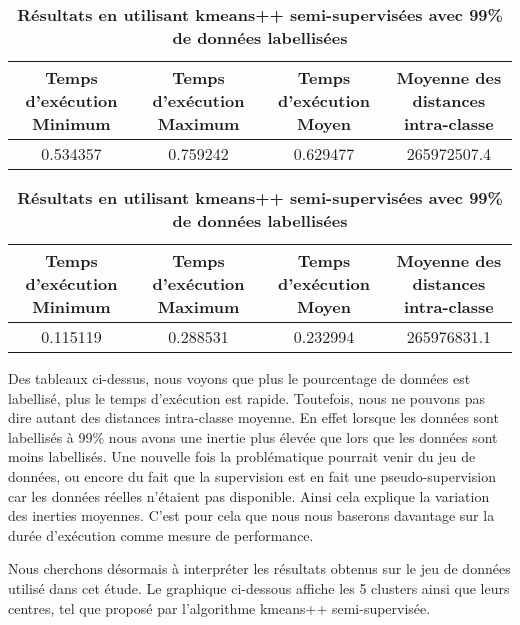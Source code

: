 \documentclass[ ]{article}
\begin{document}
\vspace{10mm}
\noindent

\begin{table}[ht]
\footnotesize
\centering

\caption{\textbf{Résultats en utilisant kmeans++ semi-supervisées avec 25\% de données labellisées}} 
\begin{tabular}{c|c|c|c}
\hline
\rowcolor{Gray}
Temps d'exécution Minimum & Temps d'exécution Maximum & Temps d'exécution Moyen & Moyenne des distances intra-classe \\
\hline
0.534357&0.759242& 0.629477& \cellcolor{LightCyan}265972507.4\\

\end{tabular}

\centering

\vspace{10 mm}
\caption{\textbf{Résultats en utilisant kmeans++ semi-supervisées avec 99\% de données labellisées}} 

\begin{tabular}{c|c|c|c}
\hline
\rowcolor{Gray}
Temps d'exécution Minimum & Temps d'exécution Maximum & Temps d'exécution Moyen & Moyenne des distances intra-classe \\
\hline
0.115119&0.288531& 0.232994& \cellcolor{LightCyan}265976831.1\\
\end{tabular}

\end{table}

\vspace{10 mm}

Des tableaux ci-dessus, nous voyons que plus le pourcentage de données est labellisé, plus le temps d'exécution est rapide. Toutefois, nous ne pouvons pas dire autant des distances intra-classe moyenne. En effet lorsque les données sont labellisés à 99\% nous avons une inertie plus élevée que lors que les données sont moins labellisés. Une nouvelle fois la problématique pourrait venir du jeu de données, ou encore du fait que la supervision est en fait une pseudo-supervision car les données réelles n'étaient pas disponible. Ainsi cela explique la variation des inerties moyennes. C'est pour cela que nous nous baserons davantage sur la durée d'exécution comme mesure de performance.

\noindent
Nous cherchons désormais à interpréter les résultats obtenus sur le jeu de données utilisé dans cet étude. Le graphique ci-dessous affiche les 5 clusters ainsi que leurs centres, tel que proposé par l'algorithme kmeans++ semi-supervisée. 
\end{document}
